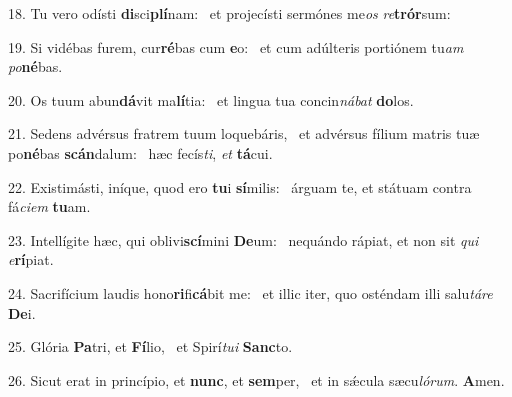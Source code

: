 18. Tu vero odísti \textbf{di}sci\textbf{plí}nam: \ast\  et projecísti sermónes me\textit{os} \textit{re}\textbf{trór}sum:\

19. Si vidébas furem, cur\textbf{ré}bas cum \textbf{e}o: \ast\  et cum adúlteris portiónem tu\textit{am} \textit{po}\textbf{né}bas.\

20. Os tuum abun\textbf{dá}vit ma\textbf{lí}tia: \ast\  et lingua tua concin\textit{ná}\textit{bat} \textbf{do}los.\

21. Sedens advérsus fratrem tuum loquebáris, \dag\  et advérsus fílium matris tuæ po\textbf{né}bas \textbf{scán}dalum: \ast\  hæc fecís\textit{ti}, \textit{et} \textbf{tá}cui.\

22. Existimásti, iníque, quod ero \textbf{tu}i \textbf{sí}milis: \ast\  árguam te, et státuam contra fá\textit{ci}\textit{em} \textbf{tu}am.\

23. Intellígite hæc, qui oblivi\textbf{scí}mini \textbf{De}um: \ast\  nequándo rápiat, et non sit \textit{qui} \textit{e}\textbf{rí}piat.\

24. Sacrifícium laudis hono\textbf{ri}fi\textbf{cá}bit me: \ast\  et illic iter, quo osténdam illi salu\textit{tá}\textit{re} \textbf{De}i.\

25. Glória \textbf{Pa}tri, et \textbf{Fí}lio, \ast\  et Spirí\textit{tu}\textit{i} \textbf{Sanc}to.\

26. Sicut erat in princípio, et \textbf{nunc}, et \textbf{sem}per, \ast\  et in sǽcula sæcu\textit{ló}\textit{rum}. \textbf{A}men.\

